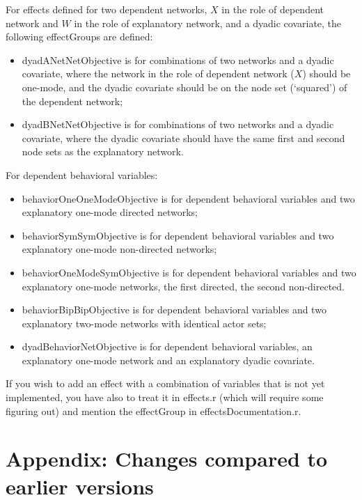 \documentclass[a4paper,fleqn,11pt]{article}
\newcommand{\+}{\, + \,}
\newcommand{\sfn}[1]{\textsf{#1}}
\begin{document}
For effects defined for two dependent networks,
$X$ in the role of dependent network and $W$ in the role
of explanatory network, and a dyadic covariate,
the following effectGroups are defined:

\begin{itemize}
\item \sfn{dyadANetNetObjective} is for combinations
    of two networks and a dyadic covariate, where the network in the role
    of dependent network ($X$) should be one-mode, and the dyadic covariate
    should be on the node set (`squared') of the dependent network;
\item \sfn{dyadBNetNetObjective} is for combinations
    of two networks and a dyadic covariate, where the dyadic covariate
    should have the same first and second node sets
    as the explanatory network.
\end{itemize}


\noindent
For dependent behavioral variables:
\begin{itemize}
\item \sfn{behaviorOneOneModeObjective} is for dependent behavioral variables and
    two explanatory one-mode directed networks;
\item \sfn{behaviorSymSymObjective} is for dependent behavioral variables and
    two explanatory one-mode non-directed networks;
\item \sfn{behaviorOneModeSymObjective} is for dependent behavioral variables and
    two explanatory one-mode networks, the first directed, the second non-directed.
\item \sfn{behaviorBipBipObjective} is for dependent behavioral variables and
    two explanatory two-mode networks with identical actor sets;
\item \sfn{dyadBehaviorNetObjective} is for dependent behavioral variables,
   an explanatory one-mode network and an explanatory dyadic covariate.
\end{itemize}

If you wish to add an effect with a combination of variables that is not yet implemented,
you have also to treat it in \sfn{effects.r} (which will require some figuring out) and
mention the effectGroup in \sfn{effectsDocumentation.r}.


\appendix
\newpage

\section{Appendix: Changes compared to earlier versions}
\end{document}
